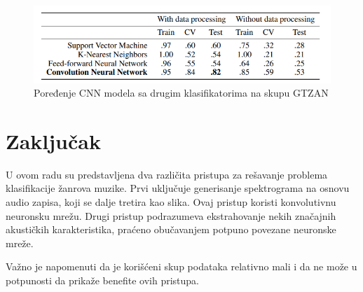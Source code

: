 \documentclass{article}
\begin{document}
\begin{figure}[h]
\centering
\includegraphics[scale=0.8]{cnn-compared}
\caption{Poređenje CNN modela sa drugim klasifikatorima na skupu GTZAN}
\end{figure}

\newpage

\section{Zaključak}

U ovom radu su predstavljena dva različita pristupa za rešavanje problema klasifikacije žanrova muzike. Prvi uključuje generisanje spektrograma na osnovu audio zapisa, koji se dalje tretira kao slika. Ovaj pristup koristi konvolutivnu neuronsku mrežu. Drugi pristup podrazumeva ekstrahovanje nekih značajnih akustičkih karakteristika, praćeno obučavanjem potpuno povezane neuronske mreže.

Važno je napomenuti da je korišćeni skup podataka relativno mali i da ne može u potpunosti da prikaže benefite ovih pristupa.
\end{document}
